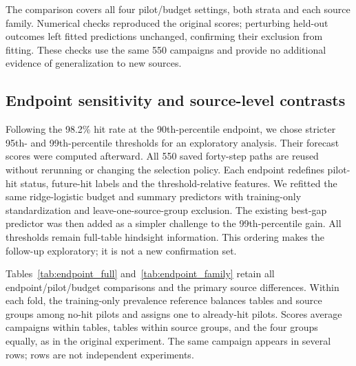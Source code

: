 \begin{table}[htbp]\centering\small
\caption{Post-result baseline challenge at pilot five and budget 20. Lower is better for both losses. All rows use identical campaign outcomes and family/table weighting; the three added references are marked *. The two strata overlap and are not replications.}
\label{tab:replay_baselines}

\end{table}

The comparison covers all four pilot/budget settings, both strata and each source family. Numerical checks reproduced the original scores; perturbing held-out outcomes left fitted predictions unchanged, confirming their exclusion from fitting. These checks use the same 550 campaigns and provide no additional evidence of generalization to new sources.

\subsection{Endpoint sensitivity and source-level contrasts}
\label{app:endpoint_sensitivity}
Following the 98.2\% hit rate at the 90th-percentile endpoint, we chose stricter 95th- and 99th-percentile thresholds for an exploratory analysis. Their forecast scores were computed afterward. All 550 saved forty-step paths are reused without rerunning or changing the selection policy. Each endpoint redefines pilot-hit status, future-hit labels and the threshold-relative features. We refitted the same ridge-logistic budget and summary predictors with training-only standardization and leave-one-source-group exclusion. The existing best-gap predictor was then added as a simpler challenge to the 99th-percentile gain. All thresholds remain full-table hindsight information. This ordering makes the follow-up exploratory; it is not a new confirmation set.

Tables~\ref{tab:endpoint_full} and~\ref{tab:endpoint_family} retain all endpoint/pilot/budget comparisons and the primary source differences. Within each fold, the training-only prevalence reference balances tables and source groups among no-hit pilots and assigns one to already-hit pilots. Scores average campaigns within tables, tables within source groups, and the four groups equally, as in the original experiment. The same campaign appears in several rows; rows are not independent experiments.

\begin{table}[htbp]\centering\small
\caption{Endpoint sensitivity: family-balanced Brier scores. All three targets, two pilots, two budgets, four predictors and both strata are retained. The two strata overlap. Lower is better.}
\label{tab:endpoint_full}

\end{table}

